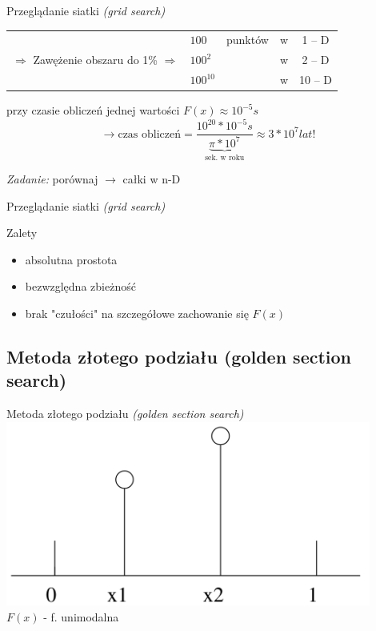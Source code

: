   \begin{frame}{Przeglądanie siatki \emph{(grid search)}}
    \begin{tabular}{@{} c l c c c @{}}
      & $ 100 $ & punktów & w & 1 -- D \\
      $ \Rightarrow $ Zawężenie obszaru do 1\% $ \Rightarrow $ & $ 100^{2} $ & & w & 2 -- D \\
      & $ 100^{10} $ & & w & 10 -- D \\
    \end{tabular}
    przy czasie obliczeń jednej wartości $F(x) \approx 10^{-5}s$
    \begin{displaymath}
      \to \text{czas obliczeń} = \frac{10^{20}*10^{-5}s}{\underbrace{\pi * 10^{7}}_{\text{sek. w roku}}} \approx 3 * 10^{7}lat \text{!}
    \end{displaymath}
    \begin{flushright}
      \emph{Zadanie:} porównaj $\to$ całki w n-D
    \end{flushright}
  \end{frame}

  \begin{frame}{Przeglądanie siatki \emph{(grid search)}}
    \begin{block}{Zalety}
      \begin{itemize}
        \item absolutna prostota
        \item bezwzględna zbieżność
        \item brak "czułości" na szczegółowe zachowanie się $F(x)$
      \end{itemize}
    \end{block}
  \end{frame}

\subsection{Metoda złotego podziału (golden section search)}
  \begin{frame}{Metoda złotego podziału \emph{(golden section search)}}
    \includegraphics[width=0.9\textwidth]{img/17/f_unimodalna}
    \\
    $F(x)$ - f. unimodalna
  \end{frame}

